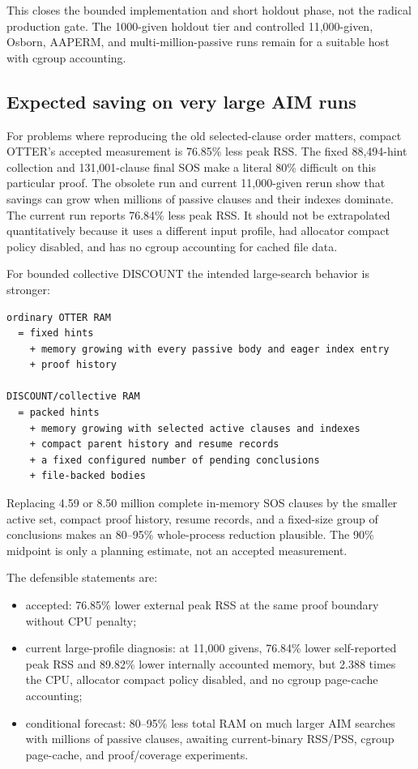 \documentclass[11pt]{article}
\begin{document}
This closes the bounded implementation and short holdout phase, not the
radical production gate.  The 1000-given holdout tier and controlled
11,000-given, Osborn, AAPERM, and multi-million-passive runs remain for a
suitable host with cgroup accounting.

\subsection{Expected saving on very large AIM runs}

For problems where reproducing the old selected-clause order matters, compact
OTTER's accepted measurement is 76.85\%
less peak RSS.  The fixed 88,494-hint collection and 131,001-clause final SOS make a
literal 80\% difficult on this particular proof.  The obsolete run and current
11,000-given rerun show that savings can grow when millions of passive clauses
and their indexes dominate.  The current run reports 76.84\% less peak RSS.  It
should not be extrapolated quantitatively because it uses a different input
profile, had allocator compact policy disabled, and has no cgroup accounting
for cached file data.

For bounded collective DISCOUNT the intended large-search behavior is stronger:

\begin{lstlisting}
ordinary OTTER RAM
  = fixed hints
    + memory growing with every passive body and eager index entry
    + proof history

DISCOUNT/collective RAM
  = packed hints
    + memory growing with selected active clauses and indexes
    + compact parent history and resume records
    + a fixed configured number of pending conclusions
    + file-backed bodies
\end{lstlisting}

Replacing 4.59 or 8.50 million complete in-memory SOS clauses by the smaller
active set, compact proof history, resume records, and a fixed-size group of
conclusions makes an 80--95\% whole-process reduction plausible.  The 90\%
midpoint is only a planning estimate, not an accepted measurement.

The defensible statements are:
\begin{itemize}
  \item accepted: 76.85\% lower external peak RSS at the same proof boundary
        without CPU penalty;
  \item current large-profile diagnosis: at 11,000 givens, 76.84\% lower
        self-reported peak RSS and 89.82\% lower internally accounted memory,
        but 2.388 times the CPU, allocator compact policy disabled, and no
        cgroup page-cache accounting;
  \item conditional forecast: 80--95\% less total RAM on much larger
        AIM searches with millions of passive clauses, awaiting current-binary
        RSS/PSS,
        cgroup page-cache, and proof/coverage experiments.
\end{itemize}
\end{document}
